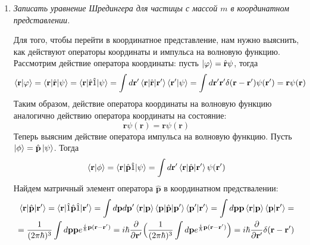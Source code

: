 \documentclass{article}
\begin{document}
\begin{enumerate}
	\item \textit{Записать уравнение Шредингера для частицы с массой $m$ в координатном представлении.}
	
	Для того, чтобы перейти в координатное представление, нам нужно выяснить, как действуют операторы координаты и импульса на волновую функцию. Рассмотрим действие оператора координаты: пусть $\ket{\varphi} = \hat{\textbf{r}}\psi$, тогда
	\begin{equation}
		\braket{\textbf{r}|\varphi} = \braket{\textbf{r}|\hat{\textbf{r}}|\psi} = \braket{\textbf{r}|\hat{\textbf{r}}\hat{1}|\psi} = \int d\textbf{r}' \braket{\textbf{r}|\hat{\textbf{r}}|\textbf{r}'} \braket{\textbf{r}'|\psi} = \int d\textbf{r}' \textbf{r}' \delta(\textbf{r} - \textbf{r}') \psi(\textbf{r}') = \textbf{r}\psi(\textbf{r})
	\end{equation}
	Таким образом, действие оператора координаты на волновую функцию аналогично действию оператора координаты на состояние:
	\begin{equation}
		\hat{\textbf{r}}\psi(\textbf{r}) = \textbf{r} \psi(\textbf{r})
	\end{equation}
	Теперь выясним действие оператора импульса на волновую функцию. Пусть $\ket{\phi} = \hat{\textbf{p}}\ket{\psi}$. Тогда
	\begin{equation}
		\braket{\textbf{r}|\phi} = \braket{\textbf{r}|\hat{\textbf{p}}\hat{1}|\psi} = \int d\textbf{r}' \braket{\textbf{r}|\hat{\textbf{p}}|\textbf{r}'} \psi(\textbf{r}') \label{imulseFirst}
	\end{equation}
	Найдем матричный элемент оператора $\hat{\textbf{p}}$ в координатном предствалении:
	\begin{equation}
	\begin{split}
		\braket{\textbf{r}|\hat{\textbf{p}}|\textbf{r}'} = \braket{\textbf{r}|\hat{1}\hat{\textbf{p}}\hat{1}|\textbf{r}'} = \int d\textbf{p}d\textbf{p}'\braket{\textbf{r}|\textbf{p}} \braket{\textbf{p}|\hat{\textbf{p}}|\textbf{p}'} \braket{\textbf{p}'|\textbf{r}'} = \int d\textbf{p} \textbf{p} \braket{\textbf{r}|\textbf{p}} \braket{\textbf{p}|\textbf{r}'} =\\= \frac{1}{(2\pi\hbar)^3} \int d\textbf{p} \textbf{p} e^{\frac{i}{\hbar}\textbf{p}(\textbf{r} - \textbf{r}')} = i\hbar \frac{\partial}{\partial \textbf{r}'}\Big(\frac{1}{(2\pi\hbar)^3}\int d\textbf{p} e^{\frac{i}{\hbar}\textbf{p}(\textbf{r} - \textbf{r}')}  \Big) = i\hbar \frac{\partial}{\partial \textbf{r}'} \delta(\textbf{r} - \textbf{r}')
		\end{split}
	\end{equation}

\end{enumerate}
\end{document}
